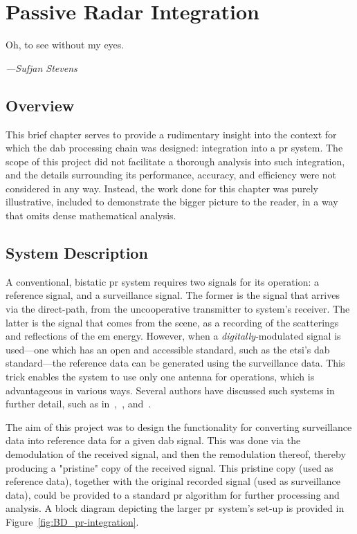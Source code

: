 \documentclass[class=report,11pt,crop=false]{standalone}
\begin{document}
\chapter{Passive Radar Integration \label{ch:pr-integration}}
\epigraph{Oh, to see without my eyes.}%
    {\emph{---Sufjan Stevens}}

\section{Overview}
This brief chapter serves to provide a rudimentary insight into the context for which the \gls{dab} processing chain was designed: integration into a \gls{pr} system. The scope of this project did not facilitate a thorough analysis into such integration, and the details surrounding its performance, accuracy, and efficiency were not considered in any way. Instead, the work done for this chapter was purely illustrative, included to demonstrate the bigger picture to the reader, in a way that omits dense mathematical analysis.

\section{System Description}
A conventional, bistatic \gls{pr} system requires two signals for its operation: a reference signal, and a surveillance signal. The former is the signal that arrives via the direct-path, from the uncooperative transmitter to system's receiver. The latter is the signal that comes from the scene, as a recording of the scatterings and reflections of the \gls{em} energy. However, when a \emph{digitally}-modulated signal is used---one which has an open and accessible standard, such as the \gls{etsi}'s \gls{dab} standard---the reference data can be generated using the surveillance data. This trick enables the system to use only one antenna for operations, which is advantageous in various ways. Several authors have discussed such systems in further detail, such as in~\cite{Barott2014},~\cite{Searle2015}, and~\cite{Fang2018}.

The aim of this project was to design the functionality for converting surveillance data into reference data for a given \gls{dab} signal. This was done via the demodulation of the received signal, and then the remodulation thereof, thereby producing a "pristine" copy of the received signal. This pristine copy (used as reference data), together with the original recorded signal (used as surveillance data), could be provided to a standard \gls{pr} algorithm for further processing and analysis. A block diagram depicting the larger \gls{pr}~system's set-up is provided in Figure~\ref{fig:BD_pr-integration}.
\end{document}

